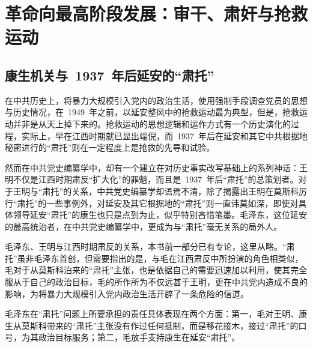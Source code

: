 
\chapter{革命向最高阶段发展：审干、肃奸与抢救运动}

\section{康生机关与~1937~年后延安的“肃托”}

在中共历史上，将暴力大规模引入党内的政治生活，使用强制手段调查党员的思想与历史情况，在~1949~年之前，以延安整风中的抢救运动最为典型，但是，抢救运动并非是从天上掉下来的。抢救运动的思想逻辑和运作方式有一个历史演化的过程，实际上，早在江西时期就已显出端倪，而~1937~年后在延安和其它中共根据地秘密进行的“肃托”则在一定程度上是抢救的先导和试验。

然而在中共党史编纂学中，却有一个建立在对历史事实改写基础上的系列神话：王明不仅是江西时期肃反“扩大化”的罪魁，而且是~1937~年后“肃托”的总策划者。对于王明与“肃托”的关系，中共党史编纂学却语焉不清，除了揭露出王明在莫斯科厉行“肃托”的一些事例外，对延安及其它根据地的“肃托”则一直讳莫如深，即使对具体领导延安“肃托”的康生也只是点到为止，似乎特别吝惜笔墨。毛泽东，这位延安的最高统治者，在中共党史编纂学中，更成为与“肃托”毫无关系的局外人。

毛泽东、王明与江西时期肃反的关系，本书前一部分已有专论，这里从略。“肃托”虽非毛泽东首创，但需要指出的是，与毛在江西肃反中所扮演的角色相类似，毛对于从莫斯科泊来的“肃托”主张，也是依据自己的需要迅速加以利用，使其完全服从于自己的政治目标，毛的所作所为不仅远甚于王明，更在中共党内造成不良的影响，为将暴力大规模引入党内政治生活开辟了一条危险的信道。

毛泽东在“肃托”问题上所要承担的责任具体表现在两个方面：第一，毛对王明、康生从莫斯科带来的“肃托”主张没有作过任何抵制，而是移花接木，接过“肃托”的口号，为其政治目标服务；第二，毛放手支持康生在延安“肃托”。

